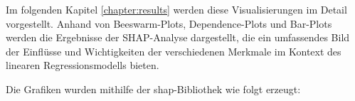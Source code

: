 Im folgenden Kapitel \ref{chapter:results} werden diese Visualisierungen im Detail vorgestellt. 
Anhand von Beeswarm-Plots, Dependence-Plots und Bar-Plots werden die Ergebnisse der 
SHAP-Analyse dargestellt, die ein umfassendes Bild der Einflüsse und Wichtigkeiten der 
verschiedenen Merkmale im Kontext des linearen Regressionsmodells bieten.

Die Grafiken wurden mithilfe der \textsf{shap}-Bibliothek wie folgt erzeugt:



